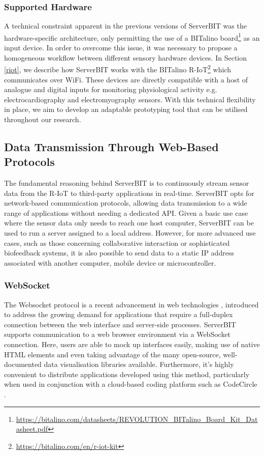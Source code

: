 \subsubsection*{Supported Hardware} \label{hardware}

A technical constraint apparent in the previous versions of ServerBIT was the hardware-specific architecture, only permitting the use of a BITalino board\footnote{\url{https://bitalino.com/datasheets/REVOLUTION_BITalino_Board_Kit_Datasheet.pdf}} as an input device. In order to overcome this issue, it was necessary to propose a homogeneous workflow between different sensory hardware devices. In Section \ref{riot}, we describe how ServerBIT works with the BITalino R-IoT\footnote{\url{https://bitalino.com/en/r-iot-kit}} which communicates over WiFi. These devices are directly compatible with a host of analogue and digital inputs for monitoring physiological activity e.g. electrocardiography and electromyography sensors. With this technical flexibility in place, we aim to develop an adaptable prototyping tool that can be utilised throughout our research.

\subsection{Data Transmission Through Web-Based Protocols}

The fundamental reasoning behind ServerBIT is to continuously stream sensor data from the R-IoT to third-party applications in real-time. ServerBIT opts for network-based communication protocols, allowing data transmission to a wide range of applications without needing a dedicated API. Given a basic use case where the sensor data only needs to reach one host computer, ServerBIT can be used to run a server assigned to a local address. However, for more advanced use cases, such as those concerning collaborative interaction or sophisticated biofeedback systems, it is also possible to send data to a static IP address associated with another computer, mobile device or microcontroller.

\subsubsection*{WebSocket}

The Websocket protocol is a recent advancement in web technologies \cite{lombardi_websocket:_2015}, introduced to address the growing demand for applications that require a full-duplex connection between the web interface and server-side processes. ServerBIT supports communication to a web browser environment via a WebSocket connection. Here, users are able to mock up interfaces easily, making use of native HTML elements and even taking advantage of the many open-source, well-documented data visualisation libraries available. Furthermore, it’s highly convenient to distribute applications developed using this method, particularly when used in conjunction with a cloud-based coding platform such as CodeCircle \cite{fiala_collaborative_2016}.

